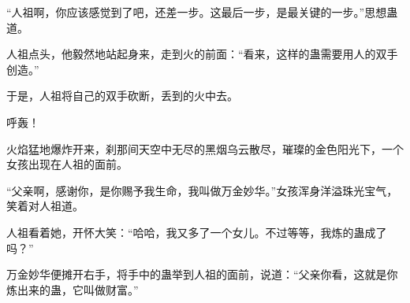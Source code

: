 \begin{this_body}
“人祖啊，你应该感觉到了吧，还差一步。这最后一步，是最关键的一步。”思想蛊道。

人祖点头，他毅然地站起身来，走到火的前面：“看来，这样的蛊需要用人的双手创造。”

于是，人祖将自己的双手砍断，丢到的火中去。

呼轰！

火焰猛地爆炸开来，刹那间天空中无尽的黑烟乌云散尽，璀璨的金色阳光下，一个女孩出现在人祖的面前。

“父亲啊，感谢你，是你赐予我生命，我叫做万金妙华。”女孩浑身洋溢珠光宝气，笑着对人祖道。

人祖看着她，开怀大笑：“哈哈，我又多了一个女儿。不过等等，我炼的蛊成了吗？”

万金妙华便摊开右手，将手中的蛊举到人祖的面前，说道：“父亲你看，这就是你炼出来的蛊，它叫做财富。”

\end{this_body}

